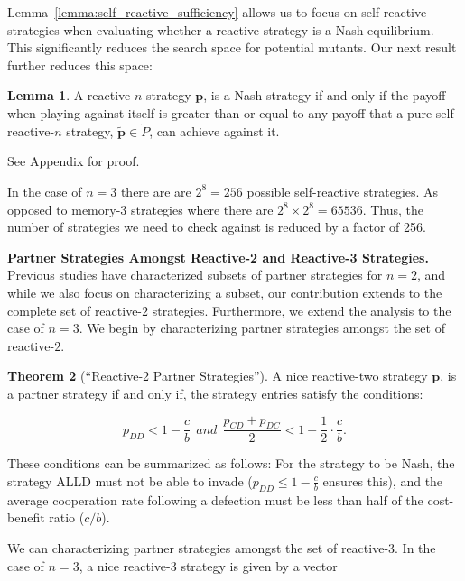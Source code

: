 \documentclass{article}
\theoremstyle{definition}
\newtheorem{theorem}{Theorem}[section]
\newtheorem{lemma}[theorem]{Lemma}
\begin{document}
Lemma~\ref{lemma:self_reactive_sufficiency} allows us to focus on self-reactive
strategies when evaluating whether a reactive strategy is a Nash equilibrium.
This significantly reduces the search space for potential mutants. Our next
result further reduces this space:

\begin{lemma}\label{lemma:nash_against_pure_self_reactive}
  A reactive-$n$ strategy $\mathbf{p}$, is a Nash strategy if and only if the
  payoff when playing against itself is greater than or equal to any payoff that
  a pure self-reactive-$n$ strategy, $\tilde{\mathbf{p}} \in \tilde{P}$, can
  achieve against it.
\end{lemma}

See Appendix for proof.

In the case of $n=3$ there are are $2^8 = 256$ possible self-reactive strategies.
As opposed to memory-3 strategies where there are $2^8 \times 2^8 = 65536$. Thus,
the number of strategies we need to check against is reduced by a factor of 256.

\textbf{Partner Strategies Amongst Reactive-2 and Reactive-3 Strategies.}
Previous studies have characterized subsets of partner strategies for $n = 2$,
and while we also focus on characterizing a subset, our contribution extends to
the complete set of reactive-$2$ strategies. Furthermore, we extend the analysis
to the case of $n = 3$. We begin by characterizing partner strategies amongst
the set of reactive-$2$.

\begin{theorem}[``Reactive-2 Partner Strategies'']\label{theorem:reactive_two_partner_strategies}
A nice reactive-two strategy $\mathbf{p}$, is a partner strategy if and only if,
the strategy entries satisfy the conditions:

\begin{equation}\label{eq:two_bit_conditions}
  \displaystyle p_{DD} < 1\!-\! \frac{c}{b}  ~~and~~ \displaystyle \frac{p_{CD} + p_{DC}}{2} < 1- \frac{1}{2} \cdot \frac{c}{b}.
\end{equation}
\end{theorem}

These conditions can be summarized as follows: For the strategy to be Nash, the
strategy ALLD must not be able to invade ($p_{DD} \leq 1 - \frac{c}{b}$
ensures this), and the average cooperation rate following a defection must be
less than half of the cost-benefit ratio ($c/b$).

We can characterizing partner strategies amongst
the set of reactive-$3$. In the case of $n=3$, a nice reactive-3 strategy is
given by a vector
\end{document}
